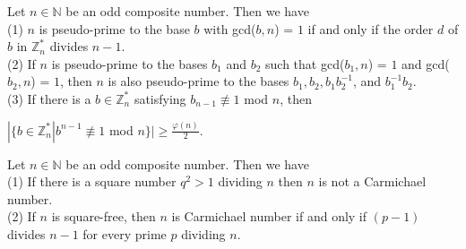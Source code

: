 \documentclass[a4paper]{article}
\begin{document}
\begin{samepage}
\begin{theorem}
Let $n \in \mathbb{N}$ be an odd composite number. Then we have \\
(1) $n$ is pseudo-prime to the base $b$ with gcd($b,n$) = $1$ if and only if the order $d$ of $b$ in $\mathbb{Z}_{n}^{*}$ divides $n - 1$.\\
(2) If $n$ is pseudo-prime to the bases $b_{1}$ and $b_{2}$ such that gcd($b_{1}, n$) = $1$ and gcd($b_{2}, n$) = $1$, then $n$ is also pseudo-prime to the bases $b_{1}, b_{2}, b_{1}b_{2}^{-1}$, and $b_{1}^{-1}b_{2}$.\\
(3) If there is a $b \in \mathbb{Z}_{n}^{*}$ satisfying $b_{n - 1} \not \equiv 1$ mod $n$, then
\begin{center}
$|\{b \in \mathbb{Z}_{n}^{*}| b^{n - 1} \not \equiv 1$ mod $n \} | \geq \frac{\varphi (n)}{2}$.
\end{center}
\end{theorem}
\end{samepage}


\begin{theorem}
Let $n \in \mathbb{N}$ be an odd composite number. Then we have \\
(1) If there is a square number $q^{2} > 1$ dividing $n$ then $n$ is not a Carmichael number. \\
(2) If $n$ is square-free, then $n$ is Carmichael number if and only if $(p - 1)$ divides $n - 1$ for every prime $p$ dividing $n$.
\end{theorem}
\end{document}

